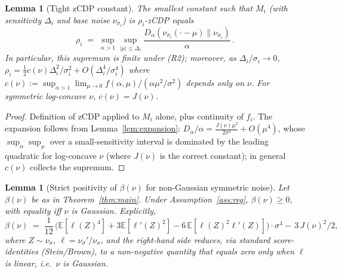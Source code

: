 \documentclass[11pt]{article}
\newtheorem{lemma}[theorem]{Lemma}
\theoremstyle{definition}
\newcommand{\E}{\mathbb{E}}
\begin{document}
\begin{lemma}[Tight zCDP constant]\label{lem:rhoi}
The smallest constant such that $M_i$ (with sensitivity $\Delta_i$ and base noise $\nu_{\sigma_i}$) is $\rho_i$-zCDP equals
\[
\rho_i\;=\;\sup_{\alpha>1}\sup_{|\mu|\le\Delta_i}\frac{D_\alpha(\nu_{\sigma_i}(\cdot-\mu)\|\nu_{\sigma_i})}{\alpha}\,.
\]
In particular, this supremum is finite under (R2); moreover, as $\Delta_i/\sigma_i\to 0$, $\rho_i=\frac{1}{2}c(\nu)\Delta_i^2/\sigma_i^2+O(\Delta_i^4/\sigma_i^4)$ where $c(\nu):=\sup_{\alpha>1}\lim_{\mu\to 0}f(\alpha,\mu)/(\alpha\mu^2/\sigma^2)$ depends only on $\nu$. For symmetric log-concave $\nu$, $c(\nu)=J(\nu)$.
\end{lemma}

\begin{proof}
Definition of zCDP applied to $M_i$ alone, plus continuity of $f_i$. The expansion follows from Lemma~\ref{lem:expansion}: $D_\alpha/\alpha=\frac{J(\nu)\mu^2}{2\sigma^2}+O(\mu^4)$, whose $\sup_\alpha\sup_\mu$ over a small-sensitivity interval is dominated by the leading quadratic for log-concave $\nu$ (where $J(\nu)$ is the correct constant); in general $c(\nu)$ collects the supremum.
\end{proof}

\begin{lemma}[Strict positivity of $\beta(\nu)$ for non-Gaussian symmetric noise]\label{lem:beta_pos}
Let $\beta(\nu)$ be as in Theorem~\ref{thm:main}. Under Assumption~\ref{ass:reg}, $\beta(\nu)\ge 0$, with equality iff $\nu$ is Gaussian. Explicitly,
\[
\beta(\nu)\;=\;\frac{1}{12}\,\bigl(\E[\ell(Z)^4]+3\E[\ell'(Z)^2]-6\,\E[\ell(Z)^2\ell'(Z)]\bigr)\cdot\sigma^4-\,3\,J(\nu)^2/2,
\]
where $Z\sim\nu_\sigma$, $\ell=\nu_\sigma'/\nu_\sigma$, and the right-hand side reduces, via standard score-identities (Stein/Brown), to a non-negative quantity that equals zero only when $\ell$ is linear, i.e.\ $\nu$ is Gaussian.
\end{lemma}
\end{document}
